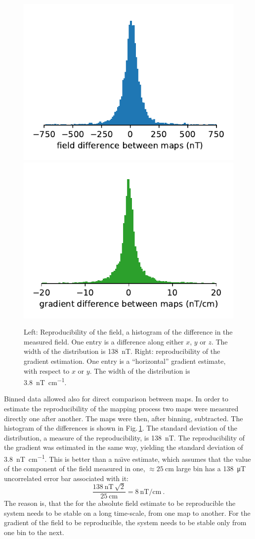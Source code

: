 \begin{figure}
  \centering
  \includegraphics[width=0.49\linewidth]{gfx/mapping/lpsc/reproducibility_field.pdf}
  \includegraphics[width=0.49\linewidth]{gfx/mapping/lpsc/reproducibility_gradient.pdf}
  \caption{Left: Reproducibility of the field, a histogram of the difference in the measured field. One entry is a difference along either $x$, $y$ or $z$. The width of the distribution is \SI{138}{\nano\tesla}. Right: reproducibility of the gradient estimation. One entry is a ``horizontal'' gradient estimate, with respect to $x$ or $y$. The width of the distribution is \SI[per-mode=symbol]{3.8}{\nano\tesla\per\centi\metre}.}\label{fig:mapping_bastille_reproducibility}
\end{figure}

Binned data allowed also for direct comparison between maps. In order to estimate the reproducibility of the mapping process two maps were measured directly one after another. The maps were then, after binning, subtracted. The histogram of the differences is shown in Fig.\,\ref{fig:mapping_bastille_reproducibility}. The standard deviation of the distribution, a measure of the reproducibility, is \SI{138}{\nano\tesla}. The reproducibility of the gradient was estimated in the same way, yielding the standard deviation of \SI[per-mode=symbol]{3.8}{\nano\tesla\per\centi\metre}. This is better than a na\"{\i}ve estimate, which assumes that the value of the component of the field measured in one, $\approx \SI{25}{\centi\metre}$ large bin has a \SI{138}{\micro\tesla} uncorrelated error bar associated with it:
\begin{equation}
  \frac{\SI{138}{\nano\tesla} \, \sqrt{2}}{\SI{25}{\centi\meter}} = \SI[per-mode=symbol]{8}{\nano\tesla\per\centi\meter} \ .
\end{equation}
The reason is, that the for the absolute field estimate to be reproducible the system needs to be stable on a long time-scale, from one map to another. For the gradient of the field to be reproducible, the system needs to be stable only from one bin to the next.

